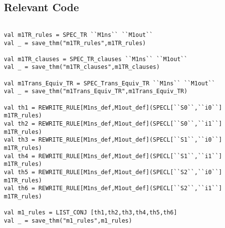 \documentclass{report}
\begin{document}
\subsection{Relevant Code}
\label{rel-code-3}
\begin{lstlisting}[frame=TBlr]

val m1TR_rules = SPEC_TR ``M1ns`` ``M1out``
val _ = save_thm("m1TR_rules",m1TR_rules)

val m1TR_clauses = SPEC_TR_clauses ``M1ns`` ``M1out``
val _ = save_thm("m1TR_clauses",m1TR_clauses)

val m1Trans_Equiv_TR = SPEC_Trans_Equiv_TR ``M1ns`` ``M1out``
val _ = save_thm("m1Trans_Equiv_TR",m1Trans_Equiv_TR)

val th1 = REWRITE_RULE[M1ns_def,M1out_def](SPECL[``S0``,``i0``] m1TR_rules)
val th2 = REWRITE_RULE[M1ns_def,M1out_def](SPECL[``S0``,``i1``] m1TR_rules)
val th3 = REWRITE_RULE[M1ns_def,M1out_def](SPECL[``S1``,``i0``] m1TR_rules)
val th4 = REWRITE_RULE[M1ns_def,M1out_def](SPECL[``S1``,``i1``] m1TR_rules)
val th5 = REWRITE_RULE[M1ns_def,M1out_def](SPECL[``S2``,``i0``] m1TR_rules)
val th6 = REWRITE_RULE[M1ns_def,M1out_def](SPECL[``S2``,``i1``] m1TR_rules)

val m1_rules = LIST_CONJ [th1,th2,th3,th4,th5,th6]
val _ = save_thm("m1_rules",m1_rules)

\end{lstlisting}
\end{document}
